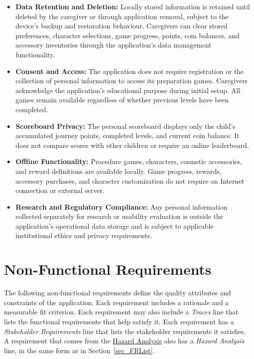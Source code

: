 \documentclass[10pt]{article}
\newcommand{\haurl}{https://team-hindsight.github.io/ophthamology-game/HazardAnalysis/HazardAnalysis.pdf}
\newcommand{\hadoc}[1]{\href{\haurl}{#1}}
\begin{document}
\begin{itemize}
    \item \textbf{Data Retention and Deletion:}
    Locally stored information is retained until
    deleted by the caregiver or through application
    removal, subject to the device's backup and
    restoration behaviour. Caregivers can clear
    stored preferences, character selections,
    game progress, points, coin balances, and
    accessory inventories through the application's
    data management functionality.

    \item \textbf{Consent and Access:}
    The application does not require registration
    or the collection of personal information
    to access its preparation games. Caregivers
    acknowledge the application's educational
    purpose during initial setup. All games remain
    available regardless of whether previous
    levels have been completed.

    \item \textbf{Scoreboard Privacy:}
    The personal scoreboard displays only the child's
    accumulated journey points, completed levels,
    and current coin balance. It does not compare
    scores with other children or require an
    online leaderboard.

    \item \textbf{Offline Functionality:}
    Procedure games, characters, cosmetic accessories,
    and reward definitions are available locally.
    Game progress, rewards, accessory purchases,
    and character customization do not require
    an Internet connection or external server.

    \item \textbf{Research and Regulatory Compliance:}
    Any personal information collected separately
    for research or usability evaluation is outside
    the application's operational data storage
    and is subject to applicable institutional
    ethics and privacy requirements.

\end{itemize}


\newpage
\section{Non-Functional Requirements}
\label{non-func-req}

The following non-functional requirements define the quality attributes
and constraints of the application. Each requirement includes a rationale
and a measurable fit criterion. Each requirement may also include a \textit{Traces} line that lists
the functional requirements that help satisfy it. Each requirement has a
\textit{Stakeholder Requirements} line that lists the stakeholder requirements
it satisfies. A requirement that comes from
the \hadoc{Hazard Analysis} also has a \textit{Hazard Analysis} line, in the
same form as in Section~\ref{sec_FRList}.
\end{document}
